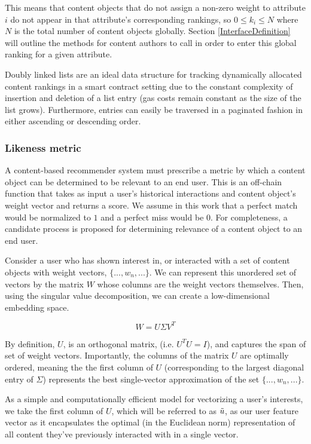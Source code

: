 This means that content objects that do not assign a non-zero weight to attribute $i$ do not appear in that attribute's corresponding rankings, so $0 \leq k_i \leq N$ where $N$ is the total number of content objects globally. Section \ref{InterfaceDefinition} will outline the methods for content authors to call in order to enter this global ranking for a given attribute. 

Doubly linked lists are an ideal data structure for tracking dynamically allocated content rankings in a smart contract setting due to the constant complexity of insertion and deletion of a list entry (gas costs remain constant as the size of the list grows). Furthermore, entries can easily be traversed in a paginated fashion in either ascending or descending order. 

\subsubsection{Likeness metric}
\label{LikenessMetricDefinition}

A content-based recommender system must prescribe a metric by which a content object can be determined to be relevant to an end user. This is an off-chain function that takes as input a user's historical interactions and content object's weight vector and returns a score. We assume in this work that a perfect match would be normalized to $1$ and a perfect miss would be $0$. For completeness, a candidate process is proposed for determining relevance of a content object to an end user.

Consider a user who has shown interest in, or interacted with a set of content objects with weight vectors, $\{..., w_n,...\}$. We can represent this unordered set of vectors by the matrix $W$ whose columns are the weight vectors themselves. Then, using the singular value decomposition, we can create a low-dimensional embedding space.  

\begin{equation}
    W = U \Sigma V^T
\end{equation}

By definition, $U$, is an orthogonal matrix, (i.e. $U^TU = I$), and captures the span of set of weight vectors. Importantly, the columns of the matrix $U$ are optimally ordered, meaning the the first column of $U$ (corresponding to the largest diagonal entry of $\Sigma$) represents the best single-vector approximation of the set $\{..., w_n,...\}$. 

As a simple and computationally efficient model for vectorizing a user's interests, we take the first column of $U$, which will be referred to as $\Tilde{u}$, as our user feature vector as it encapsulates the optimal (in the Euclidean norm) representation of all content they've previously interacted with in a single vector.

